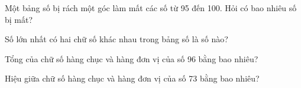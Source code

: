 \begin{ex} %
Một bảng số bị rách một góc làm mất các số từ 95 đến 100. Hỏi có bao nhiêu số bị mất?
\end{ex}

\begin{ex} %
Số lớn nhất có hai chữ số khác nhau trong bảng số là số nào?
\end{ex}

\begin{ex} %
Tổng của chữ số hàng chục và hàng đơn vị của số 96 bằng bao nhiêu?
\end{ex}

\begin{ex} %
Hiệu giữa chữ số hàng chục và hàng đơn vị của số 73 bằng bao nhiêu?
\end{ex}
